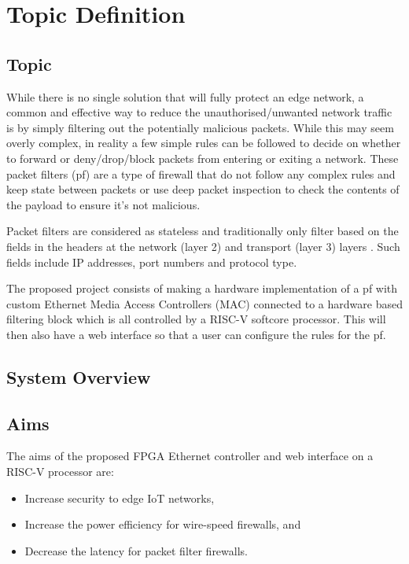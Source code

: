 \chapter[Topic Definition]{Topic Definition}
\label{Chap:label}	%
\pagestyle{headings}


\section{Topic}

While there is no single solution that will fully protect an edge network, a common and effective way to reduce the unauthorised/unwanted network 
traffic is by simply filtering out the potentially malicious packets. While this may seem overly complex, in reality a few simple rules can be followed
to decide on whether to forward or deny/drop/block packets from entering or exiting a network. These packet filters (pf) are a type of firewall that do 
not follow any complex rules and keep state between packets or use deep packet inspection to check the contents of the payload to ensure it's not 
malicious. 

Packet filters are considered as stateless and traditionally only filter based on the fields in the headers at the network (layer 2) and transport 
(layer 3) layers \cite{FirewallsBook}. Such fields include IP addresses, port numbers and protocol type.

The proposed project consists of making a hardware implementation of a pf with custom Ethernet Media Access Controllers (MAC) connected to a hardware
based filtering block which is all controlled by a RISC-V softcore processor. This will then also have a web interface so that a user can configure
the rules for the pf.

\section{System Overview}



\section{Aims}

The aims of the proposed FPGA Ethernet controller and web interface on a RISC-V processor are:

\begin{itemize}
    \item Increase security to edge IoT networks,
    \item Increase the power efficiency for wire-speed firewalls, and
    \item Decrease the latency for packet filter firewalls.
\end{itemize}



